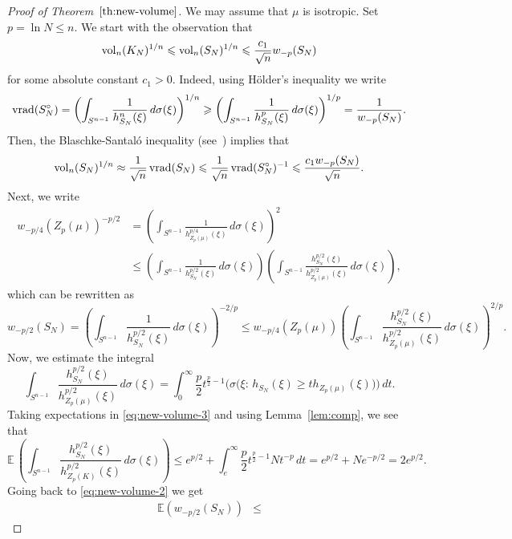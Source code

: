 \documentclass[11pt,leqno]{article}
\theoremstyle{definition}
\theoremstyle{remark}
\numberwithin{equation}{section}
\newcommand{\vol}{{\rm vol}}
\newcommand{\vrad}{{\rm vrad}}
\newcommand{\ls}{\leqslant}
\newcommand{\gr}{\geqslant}
\newcommand{\1}{\textbf{1}}
\begin{document}
\begin{proof}[Proof of Theorem~$\ref{th:new-volume}$]We may assume that $\mu$ is
isotropic. Set $p=\ln N \ls n$. We start with the observation that
\begin{equation}\label{eq:new-volume-1}\vol_n(K_N)^{1/n}\ls \vol_n(S_N)^{1/n}\ls \frac{c_1}{\sqrt{n}}
w_{-p}(S_N)\end{equation} for some absolute constant $c_1>0$. Indeed, using H\"{o}lder's inequality we write
$$\vrad(S_N^{\circ }) =\left (\int_{S^{n-1}}\frac{1}{h_{S_N}^n(\xi )}\,d\sigma
(\xi )\right )^{1/n}\gr \left
(\int_{S^{n-1}}\frac{1}{h_{S_N}^p(\xi )}\,d\sigma (\xi )\right
)^{1/p}=\frac{1}{w_{-p}(S_N)}.$$ Then, the
Blaschke-Santal\'{o} inequality (see~\cite[Theorem~1.5.10]{AGA-book}) implies that
\begin{equation*}\vol_n(S_N)^{1/n}\approx \frac{1}{\sqrt{n}}\,\vrad(S_N)\ls \frac{1}{\sqrt{n}}\,\vrad(S_N^{\circ })^{-1}\ls
\frac{c_1w_{-p}(S_N)}{\sqrt{n}}.\end{equation*}
Next, we write
\begin{align*}
w_{-p/4}(Z_p(\mu ))^{-p/2} &= \left
(\int_{S^{n-1}}\frac{1}{h^{p/4}_{Z_p(\mu )}(\xi )}\,d\sigma
(\xi )\right )^2\\
&\ls  \left (\int_{S^{n-1}}\frac{1}{h^{p/2}_{S_N}(\xi )}\,d\sigma
(\xi )\right )\left (\int_{S^{n-1}}\frac{h^{p/2}_{S_N}(\xi
)}{h^{p/2}_{Z_p(\mu )}(\xi )}\,d\sigma (\xi )\right ),
\end{align*}
which can be rewritten as
\begin{equation}\label{eq:new-volume-2}w_{-p/2}(S_N)=\left (\int_{S^{n-1}}\frac{1}{h^{p/2}_{S_N}(\xi )}\,d\sigma
(\xi )\right )^{-2/p}\ls w_{-p/4}(Z_p(\mu )) \left (\int_{S^{n-1}}\frac{h^{p/2}_{S_N}(\xi
)}{h^{p/2}_{Z_p(\mu )}(\xi )}\,d\sigma (\xi )\right )^{2/p}.\end{equation}
Now, we estimate the integral
\begin{equation}\label{eq:new-volume-3}\int_{S^{n-1}}\frac{h^{p/2}_{S_N}(\xi
)}{h^{p/2}_{Z_p(\mu )}(\xi )}\,d\sigma (\xi
)=\int_0^{\infty }\frac{p}{2}t^{\frac{p}{2}-1}\big(\sigma \big (\xi :\,h_{S_N}(\xi
)\gr th_{Z_p(\mu )}(\xi )\big )\big)\,dt. \end{equation}
Taking expectations in \ref{eq:new-volume-3} and using Lemma~\ref{lem:comp}, we see that
$${\mathbb E}\,\left(\int_{S^{n-1}}\frac{h^{p/2}_{S_N}(\xi)}{h^{p/2}_{Z_p(K)}(\xi )}\,d\sigma (\xi )\right)
\ls e^{p/2}+\int_e^{\infty }\frac{p}{2}t^{\frac{p}{2}-1}Nt^{-p}\,dt= e^{p/2}+ Ne^{-p/2}=2e^{p/2}.$$
Going back to \eqref{eq:new-volume-2} we get
\begin{align}\label{eq:new-volume-4}\mathbb{E}(w_{-p/2}(S_N)) &\ls

\end{align}
\end{proof}
\end{document}
